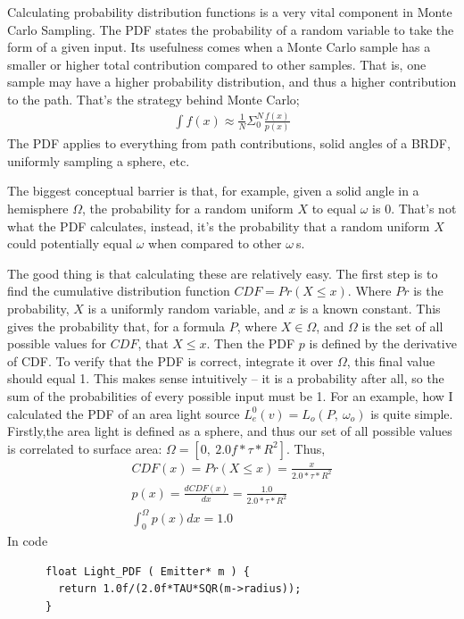 \message{ !name(test.tex)}\documentclass{article}
\begin{document}
    Calculating probability distribution functions is a very vital component in
Monte Carlo Sampling. The PDF states the probability of a random variable to
take the form of a given input. Its usefulness comes when a Monte Carlo
sample has a smaller or higher total contribution compared to other samples.
That is, one sample may have a higher probability distribution, and thus a
higher contribution to the path. That's the strategy behind Monte Carlo;
    \begin{align}
      \int f(x) \approx \frac{1}{N}\Sigma_0^N\frac{f(x)}{p(x)}
    \end{align}
    The PDF applies to everything from path contributions, solid angles of a
    BRDF, uniformly sampling a sphere, etc.
    
    The biggest conceptual barrier is that, for example, given a solid angle in
a hemisphere $\Omega$, the probability for a random uniform $X$ to equal
$\omega$ is 0. That's not what the PDF calculates, instead, it's the probability
that a random uniform $X$ could potentially equal $\omega$ when compared to
other $\omega\:$s.
    

    The good thing is that calculating these are relatively easy. The first step
is to find the cumulative distribution function $CDF = Pr(X \leq x)$. Where $Pr$
is the probability, $X$ is a uniformly random variable, and $x$ is a known
constant. This gives the probability that, for a formula $P$, where $X \in
\Omega$, and $\Omega$ is the set of all possible values for $CDF$, that $X \leq
x$. Then the PDF $p$ is defined by the derivative of CDF. To verify that the PDF
is correct, integrate it over $\Omega$, this final value should equal 1. This
makes sense intuitively -- it is a probability after all, so the sum of the
probabilities of every possible input must be 1. For an example, how I
calculated the PDF of an area light source
      $L^0_e(v) = L_o(P,\:\omega_o)$ 
    is quite simple. Firstly,the area light is defined as a sphere, and thus our
set of all possible values is correlated to surface area:
    $\Omega = [0,\:2.0f*\tau*R^2]$. Thus,
    \begin{align}
      CDF(x) = Pr(X \leq x) = \frac{x}{2.0*\tau*R^2}\\
      p(x) = \frac{dCDF(x)}{dx} = \frac{1.0}{2.0*\tau*R^2}\\
      \int_0^{\Omega}p(x)dx = 1.0
    \end{align}
    In code
    \begin{lstlisting}
      float Light_PDF ( Emitter* m ) {
        return 1.0f/(2.0f*TAU*SQR(m->radius));
      }
    \end{lstlisting}
    
\end{document}
